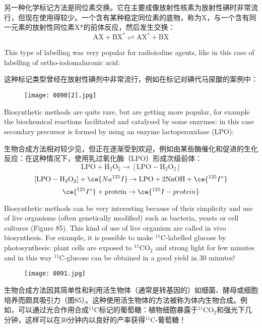 \documentclass[dvipsnames, svgnames,a4paper,11pt]{article}
\begin{document}
另一种化学标记方法是同位素交换。它在主要成像放射性核素为放射性碘时非常流行，但现在使用得较少。一个含有某种稳定同位素的底物，称为X，与一个含有同一元素的放射性同位素X*的前体反应，然后发生交换：
\[
\mathrm{AX} + \mathrm{BX}^* \rightleftharpoons \mathrm{AX}^* + \mathrm{BX}
\]

This type of labelling was very popular for radioiodine agents, like in this case of
labelling of ortho-iodomaluronic acid:

这种标记类型曾经在放射性碘剂中非常流行，例如在标记对碘代马尿酸的案例中：

\begin{figure*}[h]
    \centering
    \texttt{[image: 0090[2].jpg]}
\end{figure*}

Biosynthetic methods are quite rare, but are getting more popular, for example the
biochemical reactions facilitated and catalysed by some enzymes: in this case
secondary precursor is formed by using an enzyme lactoperoxidase (LPO):

生物合成方法相对较少见，但正在逐渐受到欢迎，例如由某些酶催化和促进的生化反应：在这种情况下，使用乳过氧化酶（LPO）形成次级前体：
\[
\mathrm{LPO} + \mathrm{H_2O_2} \rightarrow [\mathrm{LPO-H_2O_2}]
\]
\[
[\mathrm{LPO-H_2O_2}] + \ce{Na^{125}I} \rightarrow \mathrm{LPO} + 2\mathrm{NaOH} + \ce{^{125}I^*}
\]
\[
\ce{^{125}I^*} + \mathrm{protein} \rightarrow \ce{^{125}I-protein}
\]

Biosynthetic methods can be very interesting because of their simplicity and use of
live organisms (often genetically modified) such as bacteria, yeasts or cell cultures
(Figure 85). This kind of use of live organism are called in vivo biosynthesis. For
example, it is possible to make ${}^{11}\mathrm{C}$-labelled glucose by photosynthesis: plant cells
are exposed to ${}^{11}\mathrm{CO_2}$ and strong light for few minutes and in this way ${}^{11}\mathrm{C}$-glucose
can be obtained in a good yield in 30 minutes!

\begin{figure}[h]
    \centering
    \texttt{[image: 0091.jpg]}
     \label{fig85}
\end{figure}

生物合成方法因其简单性和利用活生物体（通常是转基因的）如细菌、酵母或细胞培养而颇具吸引力（图85）。这种使用活生物体的方法被称为体内生物合成。例如，可以通过光合作用合成${}^{11}\mathrm{C}$标记的葡萄糖：植物细胞暴露于${}^{11}\mathrm{CO_2}$和强光下几分钟，这样可以在30分钟内以良好的产率获得${}^{11}\mathrm{C}$-葡萄糖！
\end{document}
